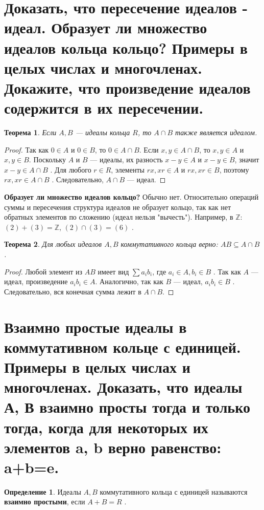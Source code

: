 \documentclass[12pt, a4paper]{article}
\theoremstyle{definition}
\newtheorem{definition}{Определение}[section]
\theoremstyle{plain}
\newtheorem{theorem}{Теорема}[section]
\begin{document}
	\newpage
	
	\section{Доказать, что пересечение идеалов - идеал. Образует ли множество идеалов кольца кольцо? Примеры в целых числах и многочленах. Докажите, что произведение идеалов содержится в их пересечении.}
	
	\begin{theorem}
		Если $A, B$ — идеалы кольца $R$, то $A \cap B$ также является идеалом.
	\end{theorem}
	\begin{proof}
		Так как $0 \in A$ и $0 \in B$, то $0 \in A \cap B$. Если $x,y \in A \cap B$, то $x,y \in A$ и $x,y \in B$. Поскольку $A$ и $B$ — идеалы, их разность $x-y \in A$ и $x-y \in B$, значит $x-y \in A \cap B$ . Для любого $r \in R$, элементы $rx, xr \in A$ и $rx, xr \in B$, поэтому $rx, xr \in A \cap B$ . Следовательно, $A \cap B$ — идеал.
	\end{proof}
	
	\textbf{Образует ли множество идеалов кольцо?} Обычно нет. Относительно операций суммы и пересечения структура идеалов не образует кольцо, так как нет обратных элементов по сложению (идеал нельзя "вычесть"). Например, в $\mathbb{Z}$: $(2)+(3)=\mathbb{Z}$, $(2) \cap (3) = (6)$ .
	
	\begin{theorem}
		Для любых идеалов $A, B$ коммутативного кольца верно: $AB \subseteq A \cap B$ .
	\end{theorem}
	\begin{proof}
		Любой элемент из $AB$ имеет вид $\sum a_i b_i$, где $a_i \in A, b_i \in B$ . Так как $A$ — идеал, произведение $a_i b_i \in A$. Аналогично, так как $B$ — идеал, $a_i b_i \in B$ . Следовательно, вся конечная сумма лежит в $A \cap B$.
	\end{proof}
	
	\newpage
	
	\section{Взаимно простые идеалы в коммутативном кольце с единицей. Примеры в целых числах и многочленах. Доказать, что идеалы А, В взаимно просты тогда и только тогда, когда для некоторых их элементов a, b верно равенство: a+b=e.}
	
	\begin{definition}
		Идеалы $A, B$ коммутативного кольца с единицей называются \textbf{взаимно простыми}, если $A+B=R$ .
	\end{definition}
	
\end{document}
